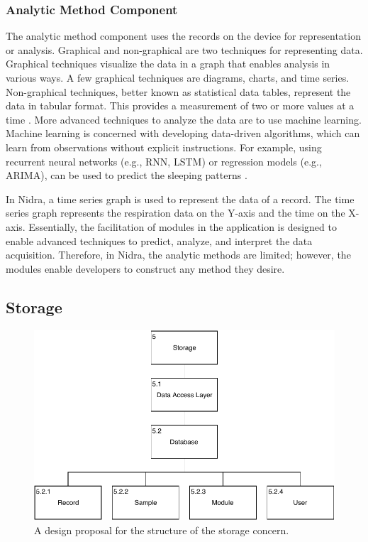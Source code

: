 \subsubsection{Analytic Method Component} \label{des:amc}
The analytic method component uses the records on the device for representation or analysis. Graphical and non-graphical are two techniques for representing data. Graphical techniques visualize the data in a graph that enables analysis in various ways. A few graphical techniques are diagrams, charts, and time series. Non-graphical techniques, better known as statistical data tables, represent the data in tabular format. This provides a measurement of two or more values at a time \cite{datarepresentation}. More advanced techniques to analyze the data are to use machine learning. Machine learning is concerned with developing data-driven algorithms, which can learn from observations without explicit instructions. For example, using recurrent neural networks (e.g., RNN, LSTM) or regression models (e.g., ARIMA), can be used to predict the sleeping patterns \cite{machinelearning}.

In Nidra, a time series graph is used to represent the data of a record. The time series graph represents the respiration data on the Y-axis and the time on the X-axis. Essentially, the facilitation of modules in the application is designed to enable advanced techniques to predict, analyze, and interpret the data acquisition. Therefore, in Nidra, the analytic methods are limited; however, the modules enable developers to construct any method they desire. 

\subsection{Storage}\label{soc:storage}

\begin{figure}
    \centering
    \includegraphics[scale=0.8]{images/Storage_Design.pdf}
    \caption{A design proposal for the structure of the storage concern.}
    \label{fig:hta_storage}
\end{figure}

